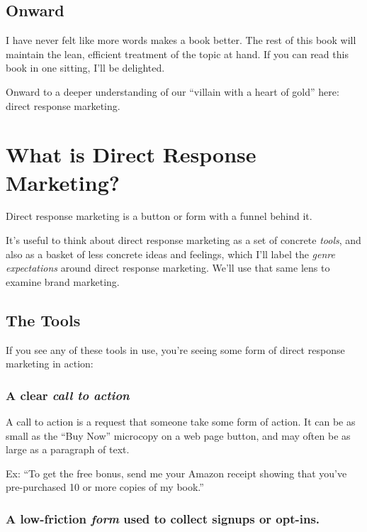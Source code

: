 \documentclass[13pt,]{tufte-handout}
\begin{document}
\hypertarget{onward}{%
\subsection{Onward}\label{onward}}

I have never felt like more words makes a book better. The rest of this
book will maintain the lean, efficient treatment of the topic at hand.
If you can read this book in one sitting, I'll be delighted.

Onward to a deeper understanding of our ``villain with a heart of gold''
here: direct response marketing.

\hypertarget{what-is-direct-response-marketing}{%
\section{What is Direct Response
Marketing?}\label{what-is-direct-response-marketing}}

Direct response marketing is a button or form with a funnel behind it.

It's useful to think about direct response marketing as a set of
concrete \emph{tools}, and also as a basket of less concrete ideas and
feelings, which I'll label the \emph{genre expectations} around direct
response marketing. We'll use that same lens to examine brand marketing.

\hypertarget{the-tools}{%
\subsection{The Tools}\label{the-tools}}

If you see any of these tools in use, you're seeing some form of direct
response marketing in action:

\hypertarget{a-clear-call-to-action}{%
\subsubsection{\texorpdfstring{A clear \emph{call to
action}}{A clear call to action}}\label{a-clear-call-to-action}}

A call to action is a request that someone take some form of action. It
can be as small as the ``Buy Now'' microcopy on a web page button, and
may often be as large as a paragraph of text.

Ex: ``To get the free bonus, send me your Amazon receipt showing that
you've pre-purchased 10 or more copies of my book.''

\hypertarget{a-low-friction-form-used-to-collect-signups-or-opt-ins.}{%
\subsubsection{\texorpdfstring{A low-friction \emph{form} used to
collect signups or
opt-ins.}{A low-friction form used to collect signups or opt-ins.}}\label{a-low-friction-form-used-to-collect-signups-or-opt-ins.}}
\end{document}
